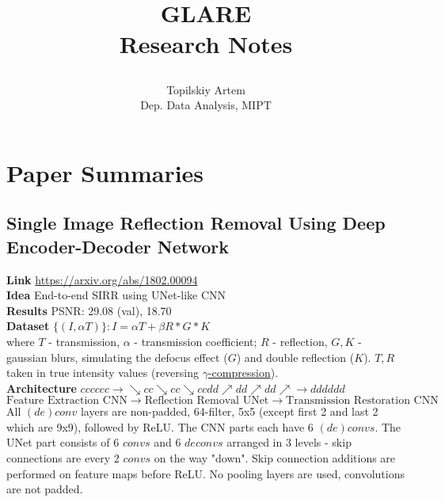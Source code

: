\documentclass[a4paper, 12pt]{article}
\begin{document}

\title{
GLARE
\\
\Large{Research Notes}
\\
\author{
Topilskiy Artem\\
Dep. Data Analysis, MIPT
}
}
\maketitle

\section{Paper Summaries}

\subsection{Single Image Reflection Removal Using Deep Encoder-Decoder Network \cite{SIRR1802}}
\textbf{Link} \cite{SIRR1802} \url{https://arxiv.org/abs/1802.00094}
~\\\textbf{Idea} End-to-end SIRR using UNet-like CNN
~\\\textbf{Results} PSNR: 29.08 (val), 18.70 \cite{SIRRBench17}
~\\\textbf{Dataset} $\{(I, \alpha T)\} : I = \alpha T + \beta R * G * K$\\
where $T$ - transmission, $\alpha$ - transmission coefficient; $R$ - reflection, $G, K$ - gaussian blurs, simulating the defocus effect ($G$) and double reflection ($K$). $T, R$ taken in true intensity values (reversing \href{https://www.cambridgeincolour.com/tutorials/gamma-correction.htm}{$\gamma$-compression}).
~\\\textbf{Architecture} $cccccc \longrightarrow \searrow cc\searrow cc\searrow ccdd \nearrow dd \nearrow dd \nearrow \longrightarrow dddddd$ \\
$\text{Feature Extraction CNN}
\longrightarrow \text{Reflection Removal UNet}
\longrightarrow \text{Transmission Restoration CNN}$\\
All $(de)conv$ layers are non-padded, 64-filter, 5x5 (except first 2 and last 2 which are 9x9), followed by ReLU. The CNN parts each have 6 $(de)convs$. The UNet part consists of 6 $convs$ and 6 $deconvs$ arranged in 3 levels - skip connections are every 2 $convs$ on the way "down". Skip connection additions are performed on feature maps before ReLU. No pooling layers are used, convolutions are not padded.
\end{document}

